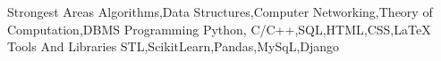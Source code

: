 

\begin{cvskills}

  \cvskill
    {Strongest Areas} %
    {Algorithms,Data Structures,Computer Networking,Theory of Computation,DBMS} %
  \cvskill
    {Programming} %
    {Python, C/C++,SQL,HTML,CSS,LaTeX} %
  \cvskill
    {Tools And Libraries } %
    {STL,ScikitLearn,Pandas,MySqL,Django} %



\end{cvskills}
